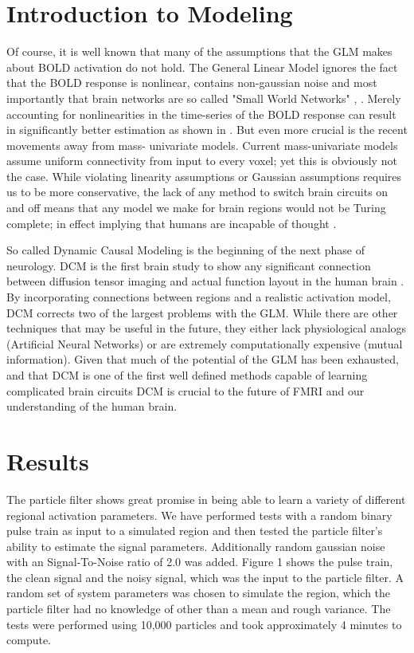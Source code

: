 \documentclass{article}
\begin{document}
\section*{Introduction to Modeling}

Of course, it is well known that many of the assumptions 
that the GLM makes about BOLD activation do not hold. 
The General Linear Model ignores
the fact that the BOLD response is nonlinear, contains non-gaussian
noise and most importantly that brain networks are 
so called "Small World Networks" \citep{smallworld}, \citep{noise}. 
Merely accounting for
nonlinearities in the time-series of the BOLD response can
result in significantly better estimation as shown in \citep{nonlinearmodels}.
But even more crucial is the recent movements away from mass-
univariate models. Current mass-univariate models 
assume uniform connectivity from input to every voxel; yet
this is obviously not the case. While
violating linearity assumptions or Gaussian assumptions 
requires us to be more conservative, the lack of any method
to switch brain circuits on and off means that any model
we make for brain regions would not be Turing complete;
in effect implying that humans are incapable of 
thought \citep{turing}.

So called Dynamic Causal Modeling is the beginning of 
the next phase of neurology. DCM is the first 
brain study to show any significant connection between 
diffusion tensor imaging and actual function layout in
the human brain \citep{dti_dcm}. By incorporating connections
between regions and a realistic activation model, DCM
corrects two of the largest problems with the GLM. While
there are other techniques that may be useful in the future,
they either lack physiological analogs (Artificial Neural
Networks) or are extremely computationally expensive 
(mutual information).  Given that much of the 
potential of the GLM has been exhausted, and that DCM 
is one of the first well defined methods capable of learning 
complicated brain circuits DCM is crucial to the future
of FMRI and our understanding of the human brain.

\section*{Results}
The particle filter shows great promise in being able 
to learn a variety of different regional activation
parameters. We have performed tests with a random binary
pulse train as input to a simulated region and then tested
the particle filter's ability to estimate the signal
parameters. Additionally random gaussian noise with an
Signal-To-Noise ratio of 2.0 was added. Figure 1 shows
the pulse train, the clean signal and the noisy signal, which
was the input to the particle filter. A random set of 
system parameters was chosen to simulate the region,
which the particle filter had no knowledge of other than
a mean and rough variance.
The tests were performed using 10,000 particles and took
approximately 4 minutes to compute.
\end{document}

